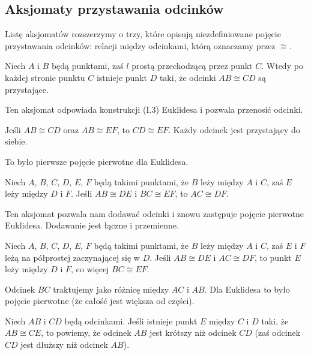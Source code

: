 %

\subsection{Aksjomaty przystawania odcinków}
Listę aksjomatów rozszerzymy o trzy, które opisują niezdefiniowane pojęcie przystawania odcinków: relacji między odcinkami, którą oznaczamy przez $\cong$.

\begin{axiom}[przystawania, C1]
    Niech $A$ i $B$ będą punktami, zaś $l$ prostą przechodzącą przez punkt $C$.
    Wtedy po każdej stronie punktu $C$ istnieje punkt $D$ taki, że odcinki $AB \cong CD$ są przystające.
\end{axiom}

Ten aksjomat odpowiada konstrukcji (I.3) Euklidesa i pozwala przenosić odcinki.
%

\begin{axiom}[przystawania, C2]
    Jeśli $AB \cong CD$ oraz $AB \cong EF$, to $CD \cong EF$.
    Każdy odcinek jest przystający do siebie.
\end{axiom}

To było pierwsze pojęcie pierwotne dla Euklidesa.

\begin{axiom}[przystawania, C3]
    Niech $A$, $B$, $C$, $D$, $E$, $F$ będą takimi punktami, że $B$ leży między $A$ i $C$, zaś $E$ leży między $D$ i $F$.
    Jeśli $AB \cong DE$ i $BC \cong EF$, to $AC \cong DF$.
\end{axiom}

Ten aksjomat pozwala nam dodawać odcinki i znowu zastępuje pojęcie pierwotne Euklidesa.
Dodawanie jest łączne i przemienne.

\begin{proposition}
    Niech $A$, $B$, $C$, $D$, $E$, $F$ będą takimi punktami, że $B$ leży między $A$ i $C$, zaś $E$ i $F$ leżą na półprostej zaczynającej się w $D$.
    Jeśli $AB \cong DE$ i $AC \cong DF$, to punkt $E$ leży między $D$ i $F$, co więcej $BC \cong EF$.
\end{proposition}

Odcinek $BC$ traktujemy jako różnicę między $AC$ i $AB$.
Dla Euklidesa to było pojęcie pierwotne (że całość jest większa od części).

\begin{definition}
    Niech $AB$ i $CD$ będą odcinkami.
    Jeśli istnieje punkt $E$ między $C$ i $D$ taki, że $AB \cong CE$, to powiemy, że odcinek $AB$ jest krótszy niż odcinek $CD$ (zaś odcinek $CD$ jest dłuższy niż odcinek $AB$).
\end{definition} %

